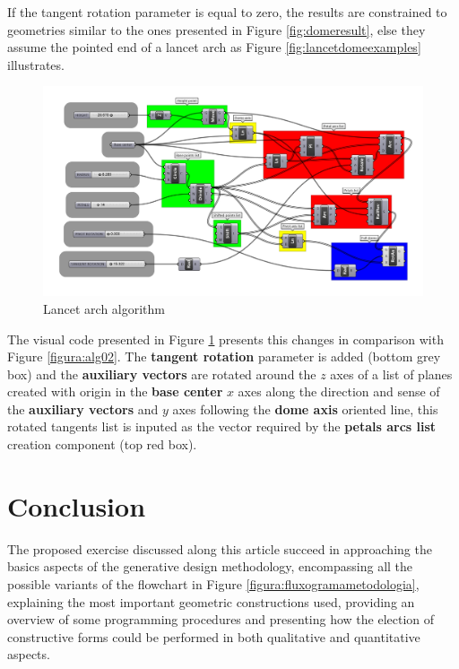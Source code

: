 \documentclass[preprint,12pt,3p]{elsarticle}
\begin{document}
If the tangent rotation parameter is equal to zero, the results are constrained to geometries similar to the ones presented in Figure \ref{fig:domeresult}, else they assume the pointed end of a lancet arch as Figure \ref{fig:lancetdomeexamples} illustrates.

\begin{figure}[!h]
\begin{center}
\includegraphics[width=0.95
\textwidth]{alg03.png}
\caption{Lancet arch algorithm}
\label{figura:alg03}
\end{center}
\end{figure}

The visual code presented in Figure \ref{figura:alg03} presents this changes in comparison with Figure \ref{figura:alg02}. The \textbf{tangent rotation} parameter is added (bottom grey box) and the \textbf{auxiliary vectors} are rotated around the $z$ axes of a list of planes created with origin in the \textbf{base center} $x$ axes along the direction and sense of the \textbf{auxiliary vectors} and $y$ axes following the \textbf{dome axis} oriented line, this rotated tangents list is inputed as the vector required by the \textbf{petals arcs list} creation component (top red box). 


\section{Conclusion}
\label{conc}

The proposed exercise discussed along this article succeed in approaching the basics aspects of the generative design methodology, encompassing all the possible variants of the flowchart in Figure \ref{figura:fluxogramametodologia}, explaining the most important geometric constructions used, providing an overview of some programming procedures and presenting how the election of constructive forms could be performed in both qualitative and quantitative aspects.
\end{document}

